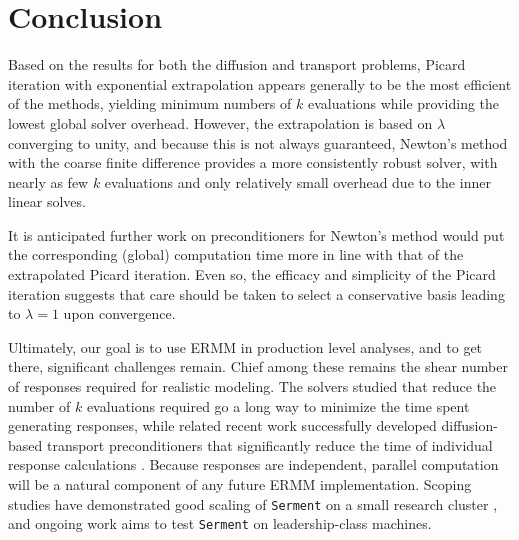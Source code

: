 \section{Conclusion}

Based on the results for both the diffusion and transport problems, Picard 
iteration with exponential extrapolation appears generally to be the most
efficient of the methods, yielding minimum numbers of $k$ evaluations 
while providing the lowest global solver overhead.  However, the 
extrapolation is based on $\lambda$ converging to unity, and because this 
is not always guaranteed, Newton's method with the coarse finite difference 
provides a more consistently robust solver, with nearly as 
few $k$ evaluations and only relatively small overhead due to the 
inner linear solves.

It is anticipated further work on preconditioners for Newton's method 
would put the corresponding (global) computation time more in line with 
that of the extrapolated Picard iteration.  Even so, the efficacy and 
simplicity of the Picard iteration suggests that care should be taken to 
select a conservative basis leading to $\lambda = 1$ upon convergence.

Ultimately, our goal is to use ERMM in production level analyses, 
and to get there, significant challenges remain.  Chief among these 
remains the shear number of responses required for realistic 
modeling.  The solvers studied that reduce the number of $k$ evaluations 
required go a long way to minimize the time spent generating  
responses, while  
related recent work successfully developed diffusion-based 
transport preconditioners that significantly reduce the time of 
individual response calculations \cite{robertsj2014jcp}.  Because 
responses are independent, parallel computation will be a natural 
component of 
any future ERMM implementation.  Scoping studies have demonstrated 
good scaling of {\tt Serment} on a small research 
cluster \cite{robertsphd}, and ongoing work aims to test {\tt Serment} on 
leadership-class machines.

